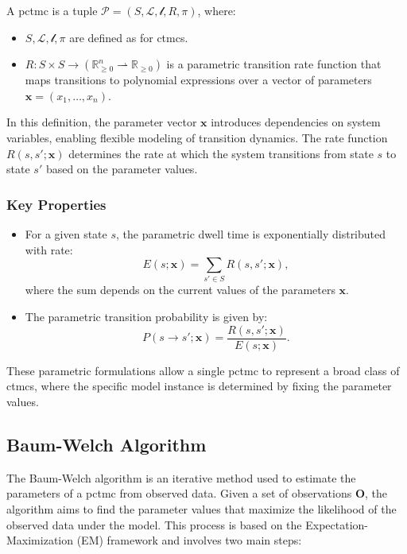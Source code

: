 \begin{definition} 
    A \gls{pctmc} is a tuple $\mathcal{P} = (S, \mathcal{L}, \mathscr{l}, R, \pi)$, where: 
    \begin{itemize} 
        \item $S, \mathcal{L}, \mathscr{l}, \pi$ are defined as for \glspl{ctmc}. 
        \item $R: S \times S \rightarrow (\mathbb{R}_{\geq 0}^n \rightharpoonup \mathbb{R}_{\geq 0})$ is a parametric transition rate function that maps transitions to polynomial expressions over a vector of parameters $\mathbf{x} = (x_1, \dots, x_n)$. 
    \end{itemize} 
\end{definition}

In this definition, the parameter vector $\mathbf{x}$ introduces dependencies on system variables, enabling flexible modeling of transition dynamics.
The rate function $R(s, s'; \mathbf{x})$ determines the rate at which the system transitions from state $s$ to state $s'$ based on the parameter values.

\subsubsection{Key Properties}

\begin{itemize}
    \item For a given state $s$, the parametric dwell time is exponentially distributed with rate:
    \begin{equation}
        E(s; \mathbf{x}) = \sum_{s' \in S} R(s, s'; \mathbf{x}),
    \end{equation}
    where the sum depends on the current values of the parameters $\mathbf{x}$.
    \item The parametric transition probability is given by:
    \begin{equation}
        P(s \rightarrow s'; \mathbf{x}) = \frac{R(s, s'; \mathbf{x})}{E(s; \mathbf{x})}.
    \end{equation}
\end{itemize}

These parametric formulations allow a single \gls{pctmc} to represent a broad class of \glspl{ctmc}, where the specific model instance is determined by fixing the parameter values.


\subsection{Baum-Welch Algorithm}\label{sec:baum-welch} 
The Baum-Welch algorithm is an iterative method used to estimate the parameters of a \gls{pctmc} from observed data. Given a set of observations $\textbf{O}$, the algorithm aims to find the parameter values that maximize the likelihood of the observed data under the model. This process is based on the Expectation-Maximization (EM) framework and involves two main steps:

